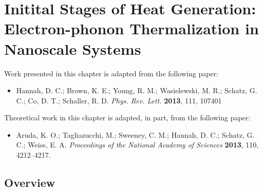 \chapter{Initital Stages of Heat Generation: Electron-phonon Thermalization in Nanoscale Systems}	%

Work presented in this chapter is adapted from the following paper:

\begin{itemize}
\item Hannah, D. C.; Brown, K. E.; Young, R. M.; Wasielewski, M. R.; Schatz, G. C.; Co, D. T.; Schaller, R. D. \emph{Phys. Rev. Lett.} \textbf{2013}, 111, 107401
\end{itemize}

Theoretical work in this chapter is adapted, in part, from the following paper:

\begin{itemize}
\item Aruda, K. O.; Tagliazucchi, M.; Sweeney, C. M.; Hannah, D. C.; Schatz, G. C.; Weiss, E. A. \emph{Proceedings of the National Academy of Sciences} \textbf{2013}, 110, 4212–4217.
\end{itemize}

\section{Overview}

